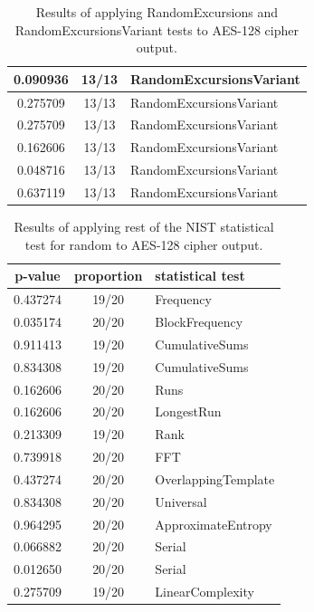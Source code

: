 \documentclass[conference]{IEEEtran}
\begin{document}
\begin{center}
\begin{table}
\begin{tabular}{|c|c|l|}
0.090936         & 13/13               & RandomExcursionsVariant   \\ \hline
0.275709         & 13/13               & RandomExcursionsVariant   \\ \hline
0.275709         & 13/13               & RandomExcursionsVariant   \\ \hline
0.162606         & 13/13               & RandomExcursionsVariant   \\ \hline
0.048716         & 13/13               & RandomExcursionsVariant   \\ \hline
0.637119         & 13/13               & RandomExcursionsVariant   \\ \hline
\end{tabular}
\caption{Results of applying RandomExcursions and RandomExcursionsVariant tests to AES-128 cipher output.}
\label{nistresults2}
\end{table}
\end{center}

\begin{center}
\begin{table}
\renewcommand{\arraystretch}{1.2}
\centering
\begin{tabular}{|c|c|l|}
\hline
\textbf{p-value} & \textbf{proportion} & \textbf{statistical test} \\ \hline
0.437274         & 19/20               & Frequency                 \\ \hline
0.035174         & 20/20               & BlockFrequency            \\ \hline
0.911413         & 19/20               & CumulativeSums            \\ \hline
0.834308         & 19/20               & CumulativeSums            \\ \hline
0.162606         & 20/20               & Runs                      \\ \hline
0.162606         & 20/20               & LongestRun                \\ \hline
0.213309         & 19/20               & Rank                      \\ \hline
0.739918         & 20/20               & FFT                       \\ \hline
0.437274         & 20/20               & OverlappingTemplate       \\ \hline
0.834308         & 20/20               & Universal                 \\ \hline
0.964295         & 20/20               & ApproximateEntropy        \\ \hline
0.066882         & 20/20               & Serial                    \\ \hline
0.012650         & 20/20               & Serial                    \\ \hline
0.275709         & 19/20               & LinearComplexity          \\ \hline
\end{tabular}
\caption{Results of applying rest of the NIST statistical test for random to AES-128 cipher output.}
\label{nistresults3}
\end{table}
\end{center}
\end{document}
